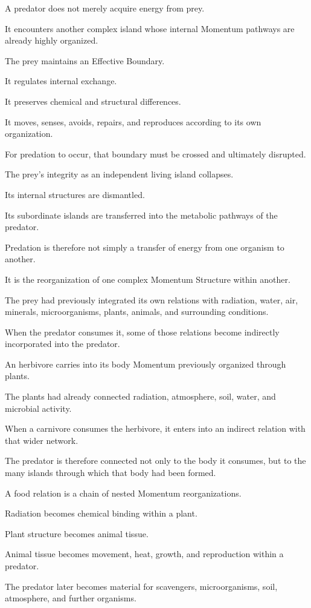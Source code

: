 A predator does not merely acquire energy from prey.

It encounters another complex island whose internal Momentum pathways are already highly organized.

The prey maintains an Effective Boundary.

It regulates internal exchange.

It preserves chemical and structural differences.

It moves, senses, avoids, repairs, and reproduces according to its own organization.

For predation to occur, that boundary must be crossed and ultimately disrupted.

The prey’s integrity as an independent living island collapses.

Its internal structures are dismantled.

Its subordinate islands are transferred into the metabolic pathways of the predator.

Predation is therefore not simply a transfer of energy from one organism to another.

It is the reorganization of one complex Momentum Structure within another.

The prey had previously integrated its own relations with radiation, water, air, minerals, microorganisms, plants, animals, and surrounding conditions.

When the predator consumes it, some of those relations become indirectly incorporated into the predator.

An herbivore carries into its body Momentum previously organized through plants.

The plants had already connected radiation, atmosphere, soil, water, and microbial activity.

When a carnivore consumes the herbivore, it enters into an indirect relation with that wider network.

The predator is therefore connected not only to the body it consumes, but to the many islands through which that body had been formed.

A food relation is a chain of nested Momentum reorganizations.

Radiation becomes chemical binding within a plant.

Plant structure becomes animal tissue.

Animal tissue becomes movement, heat, growth, and reproduction within a predator.

The predator later becomes material for scavengers, microorganisms, soil, atmosphere, and further organisms.

